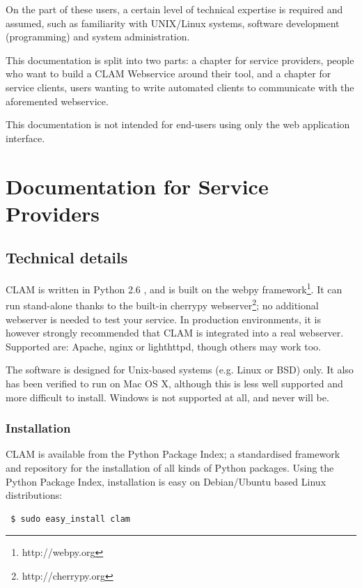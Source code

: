 \documentclass[a4paper,12pt]{report}
\begin{document}
On the part of these users, a certain level of technical expertise is required
and assumed, such as familiarity with UNIX/Linux systems, software development
(programming) and system administration.  

This documentation is split into two parts: a chapter for service providers,
people who want to build a CLAM Webservice around their tool, and a chapter for
service clients, users wanting to write automated clients to communicate with
the aforemented webservice.

This documentation is not intended for end-users using only the web application
interface. 

\chapter{Documentation for Service Providers}

\section{Technical details}

CLAM is written in Python 2.6 \citep{PYTHON}, and is built on the webpy
framework\footnote{http://webpy.org}. It can run
stand-alone thanks to the built-in cherrypy
webserver\footnote{http://cherrypy.org}; no additional webserver
is needed to test your service. In production environments, it is however
strongly recommended that CLAM is integrated into a real webserver. Supported
are: Apache, nginx or lighthttpd, though others may work too.

The software is designed for Unix-based systems (e.g. Linux or BSD) only. It
also has been verified to run on Mac OS X, although this is less well supported
and more difficult to install. Windows is not supported at all, and never will
be.

\subsection{Installation}

CLAM is available from the Python Package Index; a standardised framework and
repository for the installation of all kinds of Python packages. Using the
Python Package Index, installation is easy on Debian/Ubuntu based Linux
distributions:

\begin{verbatim} $ sudo easy_install clam \end{verbatim}
\end{document}
